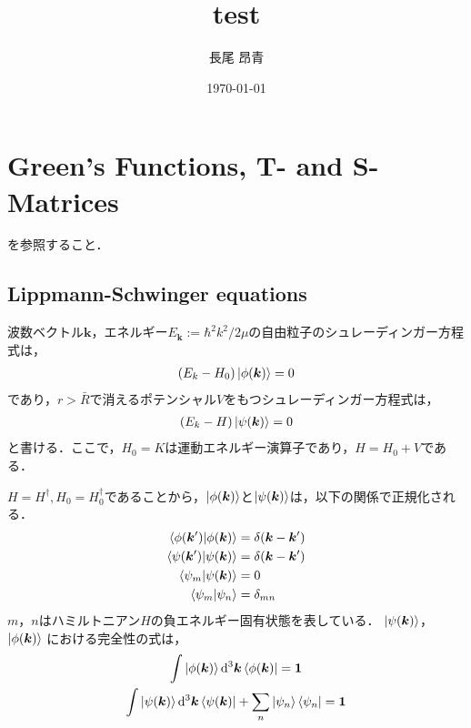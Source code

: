 \documentclass[a4paper,11pt]{ltjsarticle}
\begin{document}
\title{test}
\author{長尾 昂青}
\date{\today}
\maketitle

\tableofcontents

\newpage
\section{Green's Functions, T- and S-Matrices}

\cite{canto2013scattering}を参照すること．

\subsection{Lippmann-Schwinger equations}
波数ベクトル$\bm{k}$，エネルギー$E_{\bm{k}} := \hbar^2 k^2 / 2\mu$の自由粒子のシュレーディンガー方程式は，
\begin{align}\label{eq:free_p_shcrodinger}
  (E_k - H_0) \ket{\phi(\bm{k})} = 0
\end{align}
であり，$r>\bar{R}$で消えるポテンシャル$V$をもつシュレーディンガー方程式は，
\begin{align}\label{eq:int_p_schrodinger}
  (E_k - H)\ket{\psi(\bm{k})} = 0
\end{align}
と書ける．ここで，$H_0 = K$は運動エネルギー演算子であり，$H = H_0 + V$である．

$H = H^\dagger, H_0 = H_0^\dagger$であることから，$\ket{\phi(\bm{k})}$と$\ket{\psi(\bm{k})}$は，以下の関係で正規化される．
\begin{align}\label{eq:normalization_condition}
  \braket{\phi(\bm{k}')}{\phi(\bm{k})} &= \delta (\bm{k}- \bm{k}') \\
  \braket{\psi(\bm{k}')}{\psi(\bm{k})} &= \delta (\bm{k}-\bm{k}') \\
  \braket{\psi_m}{\psi(\bm{k})} &= 0 \\
  \braket{\psi_m}{\psi_n} &= \delta_{mn}
\end{align}
$m$，$n$はハミルトニアン$H$の負エネルギー固有状態を表している．
$\ket{\psi(\bm{k})}$，$\ket{\phi(\bm{k})}$
における完全性の式は，
\begin{gather}\label{eq:complete_set}
  \int \ket{\phi(\bm{k})} \dd[3]{\bm{k}} \bra{\phi(\bm{k})} = \bm{1} \\
  \int \ket{\psi(\bm{k})} \dd[3]{\bm{k}} \bra{\psi(\bm{k})} + \sum_n \ket{\psi_n} \bra{\psi_n} = \bm{1} 
\end{gather}
\end{document}
